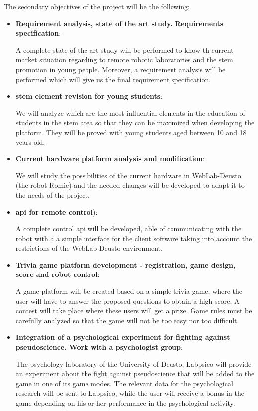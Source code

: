 The secondary objectives of the project will be the following:
\begin{itemize}
\item \textbf{Requirement analysis, state of the art study. Requirements specification}:

A complete state of the art study will be performed to know th current market situation regarding to
remote robotic laboratories and the \acrshort{stem} promotion in young people. Moreover, a
requirement analysis will be performed which will give us the final requirement specification.

\item \textbf{\acrshort{stem} element revision for young students}:

We will analyze which are the most influential elements in the education of students in the
\acrshort{stem} area so that they can be maximized when developing the platform. They will be proved
with young students aged between 10 and 18 years old.

\item \textbf{Current hardware platform analysis and modification}:

We will study the possibilities of the current hardware in WebLab-Deusto (the robot Romie) and the
needed changes will be developed to adapt it to the needs of the project.

\item \textbf{\acrshort{api} for remote control}):

A complete control \acrshort{api} will be developed, able of communicating with the robot with a
a simple interface for the client software taking into account the restrictions of the WebLab-Deusto
environment.

\item \textbf{Trivia game platform development - registration, game design, score and robot
control}:

A game platform will be created based on a simple trivia game, where the user will have to answer
the proposed questions to obtain a high score. A contest will take place where these users will get
a prize. Game rules must be carefully analyzed so that the game will not be too easy nor too
difficult.

\item \textbf{Integration of a psychological experiment for fighting against pseudoscience. Work
with a psychologist group}:

The psychology laboratory of the University of Deusto, Labpsico will provide an experiment about the
fight against pseudoscience that will be added to the game in one of its game modes. The relevant
data for the psychological research will be sent to Labpsico, while the user will receive a bonus in
the game depending on his or her performance in the psychological activity.


\end{itemize}
